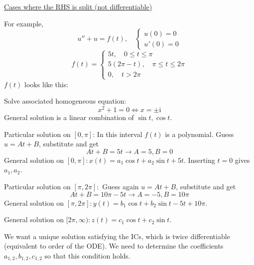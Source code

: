 \documentclass{article}
\newcommand{\mathi}{\mathrm{i}}
\newcommand{\mathpi}{\pi}
\begin{document}
{\underline{Cases where the RHS is split (not differentiable)}}

For example,
\[ u'' + u = f (t), \quad \left\{\begin{array}{l}
     u (0) = 0\\
     u' (0) = 0
   \end{array}\right. \]
\[ f (t) = \left\{\begin{array}{l}
     5 t, \quad 0 \leq t \leq \mathpi\\
     5 (2 \mathpi - t), \quad \mathpi \leq t \leq 2 \mathpi\\
     0, \quad t > 2 \mathpi
   \end{array}\right. \]
$f (t)$ looks like this:

\begin{center}
\end{center}

Solve associated homogeneous equation:
\[ x^2 + 1 = 0 \Longleftrightarrow x = \pm \mathi \]
General solution is a linear combination of $\sin t, \cos t$.

Particular solution on $[0, \mathpi]$: In this interval $f (t)$ is a
polynomial. Guess $u = At + B$, substitute and get
\[ At + B = 5 t \rightarrow A = 5, B = 0 \]
General solution on $[0, \mathpi] : x (t) = a_1 \cos t + a_2 \sin t + 5 t$.
Inserting $t = 0$ gives $a_1, a_2$.

Particular solution on $[\mathpi, 2 \mathpi] :$ Guess again $u = At + B$,
substitute and get
\[ At + B = 10 \mathpi - 5 t \rightarrow A = - 5, B = 10 \mathpi \]
General solution on $[\mathpi, 2 \mathpi] : y (t) = b_1 \cos t + b_2 \sin t -
5 t + 10 \mathpi$.

General solution on $[2 \mathpi, \infty) : z (t) = c_1 \cos t + c_2 \sin t$.

We want a unique solution satisfying the ICs, which is twice differentiable
(equivalent to order of the ODE). We need to determine the coefficients $a_{1,
2}, b_{1, 2}, c_{1, 2}$ so that this condition holds.
\end{document}
